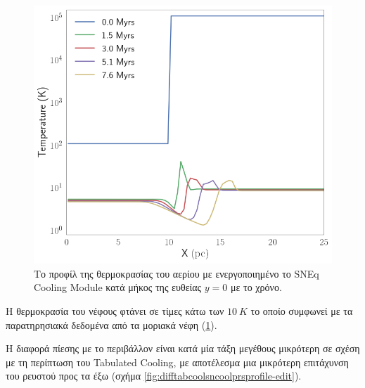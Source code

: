 \documentclass[article,a4paper,11.2pt]{memoir}
\numberwithin{equation}{subsection}
\begin{document}
\begin{figure}[h]
	\begin{adjustwidth}{-5cm}{-0cm}	
	\includegraphics[width=1\linewidth]{DataImages/SNCoolingTMPprofile}
	\caption{Το προφίλ της θερμοκρασίας του αερίου με ενεργοποιημένο το SNEq Cooling Module κατά μήκος της ευθείας $y=0$ με το χρόνο.}
	\label{fig:sncoolingtmpprofile}
\end{adjustwidth}
\end{figure}

Η θερμοκρασία του νέφους φτάνει σε τίμες κάτω των $\SI{10}{K}$ το οποίο συμφωνεί με τα παρατηρησιακά δεδομένα από τα μοριακά νέφη (\ref{fig:sncoolingtmpprofile}).

Η διαφορά πίεσης με το περιβάλλον είναι κατά μία τάξη μεγέθους μικρότερη σε σχέση με τη περίπτωση του Tabulated Cooling, με αποτέλεσμα μια μικρότερη επιτάχυνση του ρευστού προς τα έξω (σχήμα \ref{fig:difftabcoolsncoolprsprofile-edit}).
\end{document}
